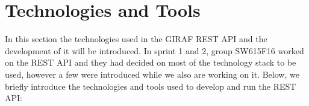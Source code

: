 

\section{Technologies and Tools}\label{sec:techstack}
In this section the technologies used in the GIRAF REST API and the development of it will be introduced.
In sprint 1 and 2, group SW615F16 worked on the REST API and they had decided on most of the technology stack to be used, however a few were introduced while we also are working on it. 
Below, we briefly introduce the technologies and tools used to develop and run the REST API:
